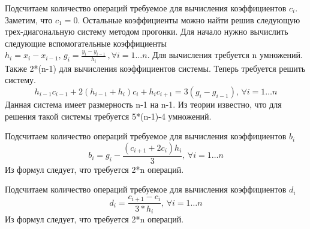 \documentclass{article}
\begin{document}
\begin{enumerate}
        
        \noindent Подсчитаем  количество операций требуемое для вычисления коэффициентов $c_i$. Заметим, что $c_1=0$. Остальные коэффициенты можно найти решив следующую трех-диагональную систему методом прогонки. Для начало нужно вычислить следующие вспомогательные коэффициенты $h_i=x_i-x_{i-1}, \, g_i = \frac{y_i-y_{i-1}}{h_i} \,, \forall i=1 \ldots n$. Для вычисления требуется n умножений. Также 2*(n-1) для вычисления коэффициентов системы. Теперь требуется решить систему.
        \[
        h_{i-1}c_{i-1}+2(h_{i-1}+h_{i})c_i+h_i c_{i+1}=3(g_i-g_{i-1}) ,\, \forall i=1 \ldots n
        \]
        Данная система имеет размерность n-1 на n-1. Из теории известно, что для решения такой системы требуется 5*(n-1)-4 умножений.
        
        
        \noindent Подсчитаем количество операций требуемое для вычисления коэффициентов $b_i$
        \[
        b_i = g_i - \frac{(c_{i+1}+2c_i)h_i}{3}, \, \forall i=1 \ldots n
        \]
        Из формул следует, что требуется 2*n операций.
        
        
        \noindent Подсчитаем количество операций требуемое для вычисления коэффициентов $d_i$
        \[
        d_i = \frac{c_{i+1}-c_i}{3*h_i}, \, \forall i=1 \ldots n
        \]
        Из формул следует, что требуется 2*n операций.
        

\end{enumerate}
\end{document}
